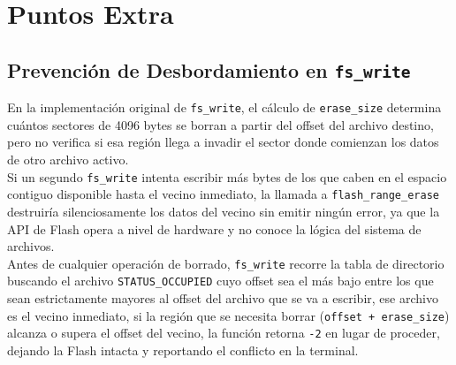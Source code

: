 \documentclass[12pt,letterpaper]{article}
\begin{document}
\newpage


\section*{Puntos Extra}

\subsection*{Prevención de Desbordamiento en \texttt{fs\_write}}
En la implementación original de \texttt{fs\_write}, el cálculo de \texttt{erase\_size} determina cuántos
sectores de 4096 bytes se borran a partir del offset del archivo destino, pero no verifica si esa región llega
a invadir el sector donde comienzan los datos de otro archivo activo.\\
Si un segundo \texttt{fs\_write} intenta escribir más bytes de los que caben en el espacio contiguo disponible
hasta el vecino inmediato, la llamada a \texttt{flash\_range\_erase} destruiría silenciosamente los datos del
vecino sin emitir ningún error, ya que la API de Flash opera a nivel de hardware y no conoce la lógica del
sistema de archivos.\\

Antes de cualquier operación de borrado, \texttt{fs\_write} recorre la tabla de directorio buscando el archivo
\texttt{STATUS\_OCCUPIED} cuyo offset sea el más bajo entre los que sean estrictamente mayores al offset del
archivo que se va a escribir, ese archivo es el vecino inmediato, si la región que se necesita borrar
(\texttt{offset + erase\_size}) alcanza o supera el offset del vecino, la función retorna \texttt{-2} en lugar
de proceder, dejando la Flash intacta y reportando el conflicto en la terminal.
\end{document}
